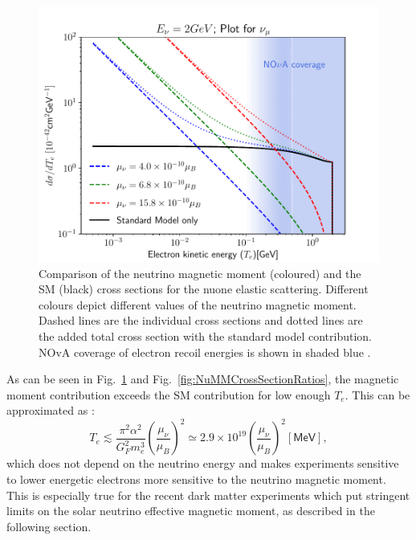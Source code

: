 \begin{figure}[hbtp]
\centering
\includegraphics[width=.9\textwidth]{Plots/NuMM/dSdTNumuMMCompAltLim.pdf}
\caption[Comparison of the neutrino magnetic moment and Standard Model cross sections]{Comparison of the neutrino magnetic moment (coloured) and the \acrshort{SM} (black) cross sections for the \acrshort{nuone} elastic scattering. Different colours depict different values of the neutrino magnetic moment. Dashed lines are the individual cross sections and dotted lines are the added total cross section with the standard model contribution. \acrshort{NOvA} coverage of electron recoil energies is shown in shaded blue .}
\label{fig:NuMMCrossSectionComparison}
\end{figure}

As can be seen in Fig.~\ref{fig:NuMMCrossSectionComparison} and Fig.~\ref{fig:NuMMCrossSectionRatios}, the magnetic moment contribution exceeds the \gls{SM} contribution for low enough $T_e$. This can be approximated as \cite{nuElmagInt2015.pdf}:
\begin{equation}
T_e\lesssim\frac{\pi^2\alpha^2}{G_F^2m_e^3}\left(\frac{\mu_{\nu}}{\mu_B}\right)^2\simeq 2.9\times 10^{19}\left(\frac{\mu_{\nu}}{\mu_B}\right)^2\left[\textsf{MeV}\right],
\end{equation}
which does not depend on the neutrino energy and makes experiments sensitive to lower energetic electrons more sensitive to the neutrino magnetic moment. This is especially true for the recent dark matter experiments which put stringent limits on the solar neutrino effective magnetic moment, as described in the following section.

